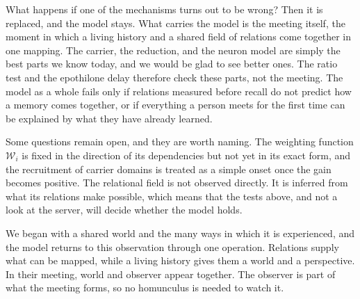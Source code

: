 What happens if one of the mechanisms turns out to be wrong? Then it is replaced, and
the model stays. What carries the model is the meeting itself, the moment in which a
living history and a shared field of relations come together in one mapping. The
carrier, the reduction, and the neuron model are simply the best parts we know today,
and we would be glad to see better ones. The ratio test and the epothilone delay
therefore check these parts, not the meeting. The model as a whole fails only if
relations measured before recall do not predict how a memory comes together, or if
everything a person meets for the first time can be explained by what they have
already learned.

Some questions remain open, and they are worth naming. The weighting function
$\mathcal W_i$ is fixed in the direction of its dependencies but not yet in its exact
form, and the recruitment of carrier domains is treated as a simple onset once the
gain becomes positive. The relational field is not observed directly. It is inferred
from what its relations make possible, which means that the tests above, and not a
look at the server, will decide whether the model holds.

We began with a shared world and the many ways in which it is experienced, and the
model returns to this observation through one operation. Relations supply what can be
mapped, while a living history gives them a world and a perspective. In their
meeting, world and observer appear together. The observer is part of what the meeting
forms, so no homunculus is needed to watch it.

